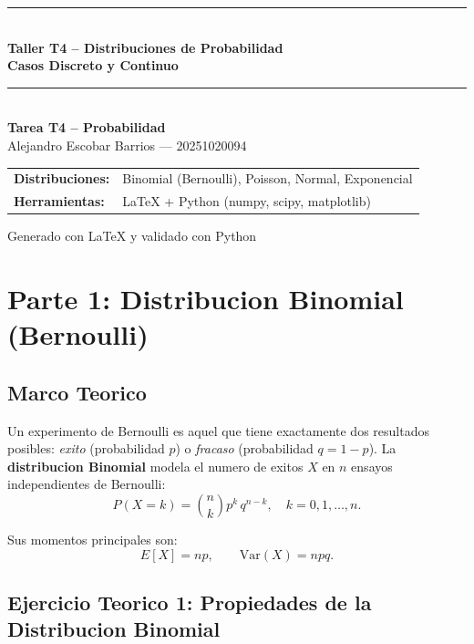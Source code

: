 \documentclass[12pt,a4paper]{article}
\begin{document}
\begin{titlepage}
  \centering
  \vspace*{2cm}
  {\color{azuluni}\rule{\linewidth}{1.5pt}}\\[0.5cm]
  {\LARGE\bfseries\color{azuluni}
   Taller T4 -- Distribuciones de Probabilidad\\[0.3cm]
   Casos Discreto y Continuo}\\[0.3cm]
  {\color{azuluni}\rule{\linewidth}{1.5pt}}\\[1.5cm]
  {\large\bfseries Tarea T4 -- Probabilidad}\\[0.4cm]
  {\large Alejandro Escobar Barrios --- 20251020094}\\[2cm]
  \begin{tabular}{ll}
    \textbf{Distribuciones:} & Binomial (Bernoulli), Poisson, Normal, Exponencial \\[0.2cm]
    \textbf{Herramientas:}   & \LaTeX{} + Python (numpy, scipy, matplotlib) \\
  \end{tabular}
  \vfill
  {\small\color{gray} Generado con \LaTeX{} y validado con Python}
\end{titlepage}

\section{Parte 1: Distribucion Binomial (Bernoulli)}

\subsection{Marco Teorico}

Un experimento de Bernoulli es aquel que tiene exactamente dos resultados posibles:
\emph{exito} (probabilidad $p$) o \emph{fracaso} (probabilidad $q = 1-p$).
La \textbf{distribucion Binomial} modela el numero de exitos $X$ en $n$ ensayos
independientes de Bernoulli:
\[
  \boxed{P(X = k) = \binom{n}{k} p^k\, q^{n-k}, \quad k = 0, 1, \ldots, n.}
\]

Sus momentos principales son:
\[
  E[X] = np, \qquad \mathrm{Var}(X) = npq.
\]

\subsection{Ejercicio Teorico 1: Propiedades de la Distribucion Binomial}
\end{document}
